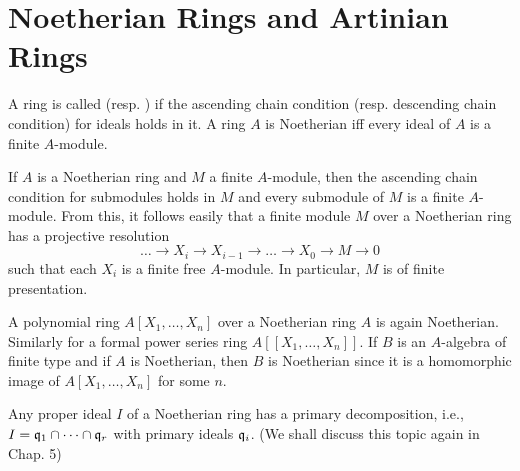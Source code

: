 \documentclass[../main]{subfiles}
\begin{document}
\section{Noetherian Rings and Artinian Rings}\label{sec:02}
\newparagraph
A ring is called  (resp. ) if the ascending chain condition (resp. descending chain condition) for ideals holds in it. A ring $A$ is Noetherian iff every ideal of $A$ is a finite $A$-module.

If $A$ is a Noetherian ring and $M$ a finite $A$-module, then the ascending chain condition for submodules holds in $M$ and every submodule of $M$ is a finite $A$-module. From this, it follows easily that a finite module $M$ over a Noetherian ring has a projective resolution \[\dots\longrightarrow X_i\longrightarrow X_{i-1}\longrightarrow\dots\longrightarrow X_0\longrightarrow M\longrightarrow 0\]such that each $X_i$ is a finite free $A$-module. In particular, $M$ is of finite presentation.

A polynomial ring $A[X_1,\dots,X_n]$ over a Noetherian ring $A$ is again Noetherian. Similarly for a formal power series ring $A[[X_1,\dots,X_n]]$. If $B$ is an $A$-algebra of finite type and if $A$ is Noetherian, then $B$ is Noetherian since it is a homomorphic image of $A[X_1,\dots,X_n]$ for some $n$.

\newparagraph
Any proper ideal $I$ of a Noetherian ring has a primary decomposition, i.e., $I=\mathfrak{q}_1\cap\cdots\cap \mathfrak{q}_r$ with primary ideals $\mathfrak{q}_i$. (We shall discuss this topic again in Chap. 5)
\end{document}
